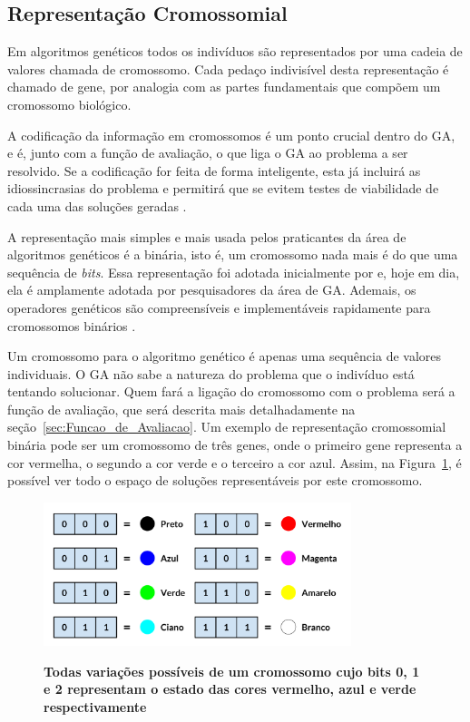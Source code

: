 \documentclass[12pt,oneside,a4paper,english,french,spanish,brazil,]{abntex2}
\begin{document}
\subsection{Representação Cromossomial}

Em algoritmos genéticos todos os indivíduos são representados por uma cadeia de valores chamada de cromossomo. Cada pedaço indivisível desta representação é chamado de gene, por analogia com as partes fundamentais que compõem um cromossomo biológico.

A codificação da informação em cromossomos é um ponto crucial dentro do GA, e é, junto com a função de avaliação, o que liga o GA ao problema a ser resolvido. Se a codificação for feita de forma inteligente, esta já incluirá as idiossincrasias do problema e permitirá que se evitem testes de viabilidade de cada uma das soluções geradas \cite{linden:2008}.

A representação mais simples e mais usada pelos praticantes da área de algoritmos genéticos é a binária, isto é, um cromossomo nada mais é do que uma sequência de \textit{bits}. Essa representação foi adotada inicialmente por \citet{holland:1992} e, hoje em dia, ela é amplamente adotada por pesquisadores da área de GA. Ademais, os operadores genéticos são compreensíveis e implementáveis rapidamente para cromossomos binários \cite{linden:2008}.

Um cromossomo para o algoritmo genético é apenas uma sequência de valores individuais. O GA não sabe a natureza do problema que o indivíduo está tentando solucionar. Quem fará a ligação do cromossomo com o problema será a função de avaliação, que será descrita mais detalhadamente na seção~\ref{sec:Funcao_de_Avaliacao}. Um exemplo de representação cromossomial binária pode ser um cromossomo de três genes, onde o primeiro gene representa a cor vermelha, o segundo a cor verde e o terceiro a cor azul. Assim, na Figura~\ref{fig:GA_Cromossomo_RGB}, é possível ver todo o espaço de soluções representáveis por este cromossomo.

\begin{figure}[ht]
\centering
\caption{\textbf{Todas variações possíveis de um cromossomo cujo bits 0, 1 e 2 representam o estado das cores vermelho, azul e verde respectivamente}}
\includegraphics[width=0.8\textwidth]{imagens/GA_Cromossomo_RGB.pdf}
\sourceAuthor	
\label{fig:GA_Cromossomo_RGB}
\end{figure}
\end{document}
